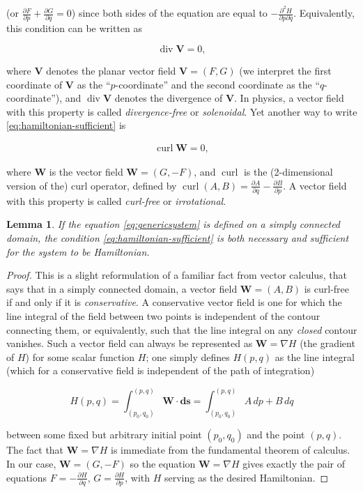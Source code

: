 \documentclass[11pt]{report}
\theoremstyle{plain}
\newtheorem{lem}[thm]{Lemma}
\theoremstyle{definition}
\begin{document}
\noindent (or
$\frac{\partial F}{\partial p} +\frac{\partial
G}{\partial q}=0$)
since both sides of the equation are equal to
$-\frac{\partial^2 H}{\partial p \partial q}$.
Equivalently, this condition can be written as

\[
\operatorname{div} \mathbf{V} = 0,
\]

\noindent where $\mathbf{V}$ denotes the planar vector field
$\mathbf{V}= (F,G)$ (we interpret the first coordinate
of $\mathbf{V}$ as the ``$p$-coordinate'' and the
second coordinate as the ``$q$-coordinate''), and
$\operatorname{div} \mathbf{V}$ denotes the divergence
of $\mathbf{V}$. In physics, a vector field with this
property is called \emph{divergence-free} or \emph{solenoidal}.
Yet another way to write \eqref{eq:hamiltonian-sufficient}
is

\begin{align*}
\operatorname{curl} \mathbf{W} = 0,
\end{align*}

\noindent where $\mathbf{W}$ is the vector field
$\mathbf{W}=(G,-F)$, and $\operatorname{curl}$ is the
(2-dimensional version of the) curl operator, defined
by
$\operatorname{curl}(A,B) = \frac{\partial A}{\partial
q}-\frac{\partial B}{\partial p}$.
A vector field with this property is called
\emph{curl-free} or \emph{irrotational}.

\begin{lem}
\label{lem:hamiltonian-div}
If the equation \eqref{eq:genericsystem} is defined on a
simply connected domain, the condition
\eqref{eq:hamiltonian-sufficient} is both necessary and
sufficient for the system to be Hamiltonian.
\end{lem}

\begin{proof}
This is a slight reformulation of a familiar fact from
vector calculus, that says that in a simply connected
domain, a vector field $\mathbf{W}=(A,B)$ is curl-free
if and only if it is \emph{conservative}. A conservative
vector field is one for which the line integral of the
field between two points is independent of the contour
connecting them, or equivalently, such that the line
integral on any \emph{closed} contour vanishes. Such a
vector field can always be represented as
$\mathbf{W} = \nabla H$ (the gradient of $H$) for some
scalar function $H$; one simply defines $H(p,q)$ as
the line integral (which for a conservative field is
independent of the path of integration)

\[
H(p,q) = \int_{(p_0,q_0)}^{(p,q)} \mathbf{W}\cdot \mathbf{ds} = \int_{(p_0,q_0)}^{(p,q)} A\,dp + B\,dq
\]

\noindent between some fixed but arbitrary initial point
$(p_0,q_0)$ and the point $(p,q)$. The fact that
$\mathbf{W}=\nabla H$ is immediate from the
fundamental theorem of calculus. In our case,
$\mathbf{W}=(G,-F)$ so the equation
$\mathbf{W}=\nabla H$ gives exactly the pair of
equations $F=-\frac{\partial H}{\partial q}$,
$G=\frac{\partial H}{\partial p}$, with $H$ serving as
the desired Hamiltonian.
\end{proof}
\end{document}
